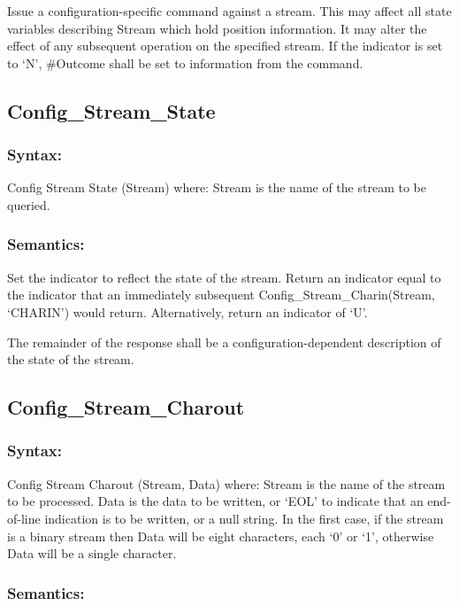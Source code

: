 Issue a configuration-specific command against a stream. This may affect
all state variables describing Stream which hold position information.
It may alter the effect of any subsequent operation on the specified
stream. If the indicator is set to `N', \#Outcome shall be set to
information from the command.

\subsection{Config\_Stream\_State}\label{config_stream_state}

\subsubsection{Syntax:}\label{syntax-26}

Config Stream State (Stream) where: Stream is the name of the stream to
be queried.

\subsubsection{Semantics:}\label{semantics-27}

Set the indicator to reflect the state of the stream. Return an
indicator equal to the indicator that an immediately subsequent
Config\_Stream\_Charin(Stream, `CHARIN') would return. Alternatively,
return an indicator of `U'.

The remainder of the response shall be a configuration-dependent
description of the state of the stream.

\subsection{Config\_Stream\_Charout}\label{config_stream_charout}

\subsubsection{Syntax:}\label{syntax-27}

Config Stream Charout (Stream, Data) where: Stream is the name of the
stream to be processed. Data is the data to be written, or `EOL' to
indicate that an end-of-line indication is to be written, or a null
string. In the first case, if the stream is a binary stream then Data
will be eight characters, each `0' or `1', otherwise Data will be a
single character.

\subsubsection{Semantics:}\label{semantics-28}

